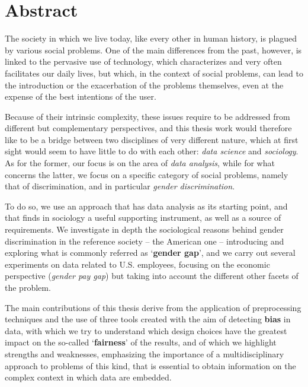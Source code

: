 
\newpage
\chapter*{Abstract}


The society in which we live today, like every other in human history, is plagued by various social problems. One of the main differences from the past, however, is linked to the pervasive use of technology, which characterizes and very often facilitates our daily lives, but which, in the context of social problems, can lead to the introduction or the exacerbation of the problems themselves, even at the expense of the best intentions of the user.

Because of their intrinsic complexity, these issues require to be addressed from different but complementary perspectives, and this thesis work would therefore like to be a bridge between two disciplines of very different nature, which at first sight would seem to have little to do with each other: \textit{data science} and \textit{sociology}. As for the former, our focus is on the area of \textit{data analysis}, while for what concerns the latter, we focus on a specific category of social problems, namely that of discrimination, and in particular \textit{gender discrimination}.

To do so, we use an approach that has data analysis as its starting point, and that finds in sociology a useful supporting instrument, as well as a source of requirements. We investigate in depth the sociological reasons behind gender discrimination in the reference society -- the American one -- introducing and exploring what is commonly referred as `\textbf{gender gap}', and we carry out several experiments on data related to U.S. employees, focusing on the economic perspective (\textit{gender pay gap}) but taking into account the different other facets of the problem.

The main contributions of this thesis derive from the application of preprocessing techniques and the use of three tools created with the aim of detecting \textbf{bias} in data, with which we try to understand which design choices have the greatest impact on the so-called `\textbf{fairness}' of the results, and of which we highlight strengths and weaknesses, emphasizing the importance of a multidisciplinary approach to problems of this kind, that is essential to obtain information on the complex context in which data are embedded.


